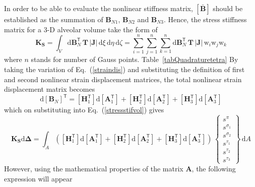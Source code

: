 In order to be able to evaluate the nonlinear stiffness matrix, $[\mathbf{\bar{B}}]$ should be established as the summation of $ \mathbf{B}_{N1}$, $\mathbf{B}_{N2}$ and $\mathbf{B}_{N3}$.
Hence, the stress stiffness matrix for a 3-D alveolar volume take the form of
\begin{equation}
\mathbf{K}_\mathbf{S} = \int_{V}  \mathrm{d} \mathbf{B}_N^{\mathsf{T}} \, \mathbf{T} \, |\mathbf{J}|  \, \mathrm{d} \xi \,  \mathrm{d} \eta \, \mathrm{d} \zeta =  \sum_{i=1}^{n} \sum_{j=1}^{n}  \sum_{k=1}^{n}    \mathrm{d} \mathbf{B}_N^{\mathsf{T}} \, \mathbf{T} \, |\mathbf{J}| \, \mathrm{w}_i \mathrm{w}_j \mathrm{w}_k
\label{stressstifvol}
\end{equation}
where $n$ stands for number of Gauss points. Table~\ref{tabQuadraturetetra}
By taking the variation of Eq.~(\ref{straindis}) and substituting the definition of first and second nonlinear strain displacement matrices, the total nonlinear strain displacement matrix becomes
\begin{equation}
\mathrm{d}[\mathbf{B}_N]^{\mathsf{T}} = [\mathbf{H}_1^{\mathsf{T}}] \mathrm{d} [\mathbf{A}_1^{\mathsf{T}}] + [\mathbf{H}_2^{\mathsf{T}}] \mathrm{d} [\mathbf{A}_2^{\mathsf{T}}] + [\mathbf{H}_3^{\mathsf{T}}] \mathrm{d} [\mathbf{A}_3^{\mathsf{T}}]
\end{equation}
which on substituting into Eq.~(\ref{stressstifvol}) gives 
\begin{equation}
\mathbf{K_\mathbf{S}} \mathrm{d} \boldsymbol{\Delta} = \int_A \left(
[\mathbf{H}_1^{\mathsf{T}}] \mathrm{d} [\mathbf{A}_1^{\mathsf{T}}] + [\mathbf{H}_2^{\mathsf{T}}] \mathrm{d} [\mathbf{A}_2^{\mathsf{T}}] + [\mathbf{H}_3^{\mathsf{T}}] \mathrm{d} [\mathbf{A}_3^{\mathsf{T}}] \right) \, \begin{Bmatrix} s^{\pi} \\ s^{\sigma_1} \\ s^{\sigma_2}  \\ s^{\tau_1} \\ s^{\tau_2} \\ s^{\tau_3} \end{Bmatrix} \, \mathrm{d} A
\end{equation}
However, using the mathematical properties of the matrix $\mathbf{A}$, the following expression will appear
